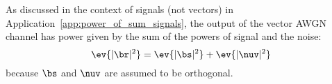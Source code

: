 As discussed in the context of signals (not vectors) in Application~\ref{app:power_of_sum_signals}, the output of the vector AWGN channel has power given by the sum of the powers of signal and the noise: 
\begin{equation}
\ev\{|\br|^2\}= \ev\{|\bs|^2\}+\ev\{|\nuv|^2\}
\label{eq:awgn_power}
\end{equation}
because $\bs$ and $\nuv$ are assumed to be orthogonal.

%
%
%
%
%

